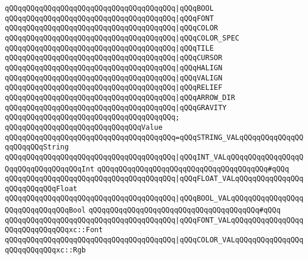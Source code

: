 \verb|qQQqqQQqqQQqqQQqqQQqqQQqqQQqqQQqqQQqqQQq|\verb#|qQQqBOOL#\newline
\verb|qQQqqQQqqQQqqQQqqQQqqQQqqQQqqQQqqQQqqQQq|\verb#|qQQqFONT#\newline
\verb|qQQqqQQqqQQqqQQqqQQqqQQqqQQqqQQqqQQqqQQq|\verb#|qQQqCOLOR#\newline
\verb|qQQqqQQqqQQqqQQqqQQqqQQqqQQqqQQqqQQqqQQq|\verb#|qQQqCOLOR_SPEC#\newline
\verb|qQQqqQQqqQQqqQQqqQQqqQQqqQQqqQQqqQQqqQQq|\verb#|qQQqTILE#\newline
\verb|qQQqqQQqqQQqqQQqqQQqqQQqqQQqqQQqqQQqqQQq|\verb#|qQQqCURSOR#\newline
\verb|qQQqqQQqqQQqqQQqqQQqqQQqqQQqqQQqqQQqqQQq|\verb#|qQQqHALIGN#\newline
\verb|qQQqqQQqqQQqqQQqqQQqqQQqqQQqqQQqqQQqqQQq|\verb#|qQQqVALIGN#\newline
\verb|qQQqqQQqqQQqqQQqqQQqqQQqqQQqqQQqqQQqqQQq|\verb#|qQQqRELIEF#\newline
\verb|qQQqqQQqqQQqqQQqqQQqqQQqqQQqqQQqqQQqqQQq|\verb#|qQQqARROW_DIR#\newline
\verb|qQQqqQQqqQQqqQQqqQQqqQQqqQQqqQQqqQQqqQQq|\verb#|qQQqGRAVITY#\newline
\verb|qQQqqQQqqQQqqQQqqQQqqQQqqQQqqQQqqQQqqQQq;|\newline
\newline
\verb|qQQqqQQqqQQqqQQqqQQqqQQqqQQqqQQqValue|\newline
\verb|qQQqqQQqqQQqqQQqqQQqqQQqqQQqqQQqqQQqqQQq=qQQqSTRING_VALqQQqqQQqqQQqqQQqqQQqqQQqString|\newline
\verb|qQQqqQQqqQQqqQQqqQQqqQQqqQQqqQQqqQQqqQQq|\verb#|qQQqINT_VALqQQqqQQqqQQqqQQqqQQqqQQqqQQqqQQqqQQqInt#\newline
\verb|qQQqqQQqqQQqqQQqqQQqqQQqqQQqqQQqqQQqqQQq#qQQq|\newline
\verb|qQQqqQQqqQQqqQQqqQQqqQQqqQQqqQQqqQQqqQQq|\verb#|qQQqFLOAT_VALqQQqqQQqqQQqqQQqqQQqqQQqqQQqFloat#\newline
\verb|qQQqqQQqqQQqqQQqqQQqqQQqqQQqqQQqqQQqqQQq|\verb#|qQQqBOOL_VALqQQqqQQqqQQqqQQqqQQqqQQqqQQqqQQqBool#\newline
\verb|qQQqqQQqqQQqqQQqqQQqqQQqqQQqqQQqqQQqqQQq#qQQq|\newline
\verb|qQQqqQQqqQQqqQQqqQQqqQQqqQQqqQQqqQQqqQQq|\verb#|qQQqFONT_VALqQQqqQQqqQQqqQQqqQQqqQQqqQQqqQQqxc::Font#\newline
\verb|qQQqqQQqqQQqqQQqqQQqqQQqqQQqqQQqqQQqqQQq|\verb#|qQQqCOLOR_VALqQQqqQQqqQQqqQQqqQQqqQQqqQQqxc::Rgb#\newline
